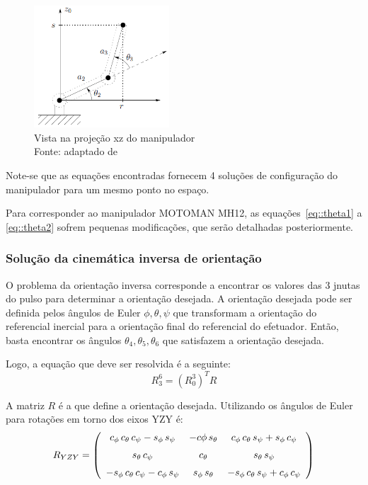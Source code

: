 \begin{figure}[h]
	\centering 
 	\includegraphics[width=0.45\textwidth]{figs/geom_pos_lat}
 	\caption[Vista na projeção xz do manipulador]{Vista na projeção xz do
 	manipulador \\ Fonte: adaptado de~\cite{spong2006robot}}
 	\label{fig::geom_pos_lat}
\end{figure}

Note-se que as equações encontradas fornecem 4 soluções de configuração do
manipulador para um mesmo ponto no espaço.

Para corresponder ao manipulador MOTOMAN MH12, as equações~\ref{eq::theta1} a
\ref{eq::theta2} sofrem pequenas modificações, que serão detalhadas
posteriormente.

\subsubsection{Solução da cinemática inversa de orientação}

O problema da orientação inversa corresponde a encontrar os valores das 3 jnutas
do pulso para determinar a orientação desejada. A orientação desejada pode ser
definida pelos ângulos de Euler $\phi, \theta, \psi$ que transformam a
orientação do referencial inercial para a orientação final do referencial do
efetuador.
Então, basta encontrar os ângulos $\theta_4, \theta_5, \theta_6$ que satisfazem
a orientação desejada.

Logo, a equação que deve ser resolvida é a seguinte:
%
\begin{equation}
	R_3^6 = (R_0^3)^T R
\end{equation}


A matriz $R$ é a que define a orientação desejada. Utilizando os ângulos de
Euler para rotações em torno dos eixos YZY é:
%
\begin{equation}
R_{YZY} = 
\left( \begin {array}{ccc} c_\phi \,c_\theta \,c_\psi -s_\phi \,s_\psi &-c
\phi \,s_\theta &c_\phi \,c_\theta \,s_\psi +s_\phi \,c_\psi 
\\ \noalign{\medskip}s_\theta \,c_\psi &c_\theta &s_\theta \,s_\psi 
\\ \noalign{\medskip}-s_\phi \,c_\theta \,c_\psi -c_\phi \,s_\psi &s_\phi \,
s_\theta &-s_\phi \,c_\theta \,s_\psi +c_\phi \,c_\psi \end {array} \right)
\end{equation}
%

